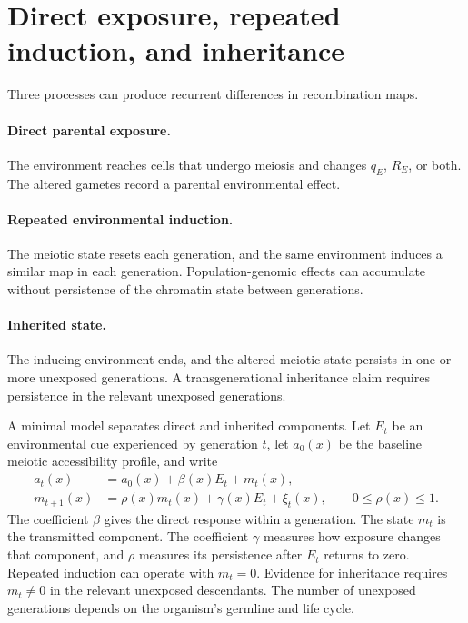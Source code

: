 \documentclass[11pt]{article}
\theoremstyle{remark}
\begin{document}
\section{Direct exposure, repeated induction, and inheritance}
\label{sec:inheritance}

Three processes can produce recurrent differences in recombination maps.

\paragraph{Direct parental exposure.}
The environment reaches cells that undergo meiosis and changes $q_E$, $R_E$, or
both. The altered gametes record a parental environmental effect.

\paragraph{Repeated environmental induction.}
The meiotic state resets each generation, and the same environment induces a
similar map in each generation. Population-genomic effects can accumulate without
persistence of the chromatin state between generations.

\paragraph{Inherited state.}
The inducing environment ends, and the altered meiotic state persists in one or
more unexposed generations. A transgenerational inheritance claim requires
persistence in the relevant unexposed generations.

A minimal model separates direct and inherited components. Let $E_t$ be an
environmental cue experienced by generation $t$, let $a_0(x)$ be the baseline
meiotic accessibility profile, and write
\begin{align}
a_t(x)&=a_0(x)+\beta(x)E_t+m_t(x),
\label{eq:direct_memory_a}\\
m_{t+1}(x)&=\rho(x)m_t(x)+\gamma(x)E_t+\xi_t(x),
\qquad 0\le \rho(x)\le 1.
\label{eq:direct_memory_m}
\end{align}
The coefficient $\beta$ gives the direct response within a generation. The state
$m_t$ is the transmitted component. The coefficient $\gamma$ measures how exposure
changes that component, and $\rho$ measures its persistence after $E_t$ returns to
zero. Repeated induction can operate with $m_t=0$. Evidence for inheritance
requires $m_t\ne0$ in the relevant unexposed descendants. The number of unexposed
generations depends on the organism's germline and life cycle.
\end{document}
